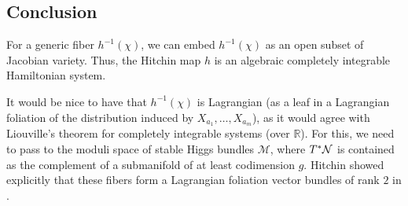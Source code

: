 \subsection{Conclusion}

For a generic fiber $h^{-1}(\chi)$, we can embed $h^{-1}(\chi)$ as an open subset of Jacobian variety. Thus, the Hitchin map $h$ is an algebraic completely integrable Hamiltonian system.

It would be nice to have that $h^{-1}(\chi)$ is Lagrangian (as a leaf in a Lagrangian foliation of the distribution induced by $X_{a_1},\ldots,X_{a_m}$), as it would agree with Liouville's theorem for completely integrable systems (over $\mathbb{R}$). For this, we need to pass to the moduli space of stable Higgs bundles $\mathcal{M}$, where $T^*\mathcal{N}$ is contained as the complement of a submanifold of at least codimension $g$. Hitchin showed explicitly that these fibers form a Lagrangian foliation vector bundles of rank $2$ in \cite[Section 7]{hitch2}.